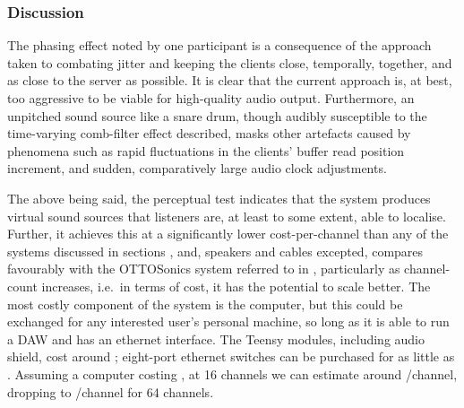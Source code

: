 \subsubsection{Discussion}\label{subsubsec:discussion-percep}

The phasing effect noted by one participant is a consequence of the approach
taken to combating jitter and keeping the clients close, temporally, together,
and as close to the server as possible.
It is clear that the current approach is, at best, too aggressive to be viable
for high-quality audio output.
Furthermore, an unpitched sound source like a snare drum, though audibly
susceptible to the time-varying comb-filter effect described, masks other
artefacts caused by phenomena such as rapid fluctuations in the clients' buffer
read position increment, and sudden, comparatively large audio clock
adjustments.

The above being said, the perceptual test indicates that the system produces
virtual sound sources that listeners are, at least to some extent, able to
localise.
Further, it achieves this at a significantly lower cost-per-channel than any of
the systems discussed in sections , and, speakers
and cables excepted, compares favourably with the OTTOSonics system referred to
in , particularly as channel-count
increases, i.e.\ in terms of cost, it has the potential to scale better.
The most costly component of the system is the computer, but this could be
exchanged for any interested user's personal machine, so long as it is able to
run a DAW and has an ethernet interface.
The Teensy modules, including audio shield, cost around ;
eight-port ethernet switches can be purchased for as little as .
Assuming a computer costing , at 16 channels we can estimate
around /channel, dropping to /channel for 64
channels.
